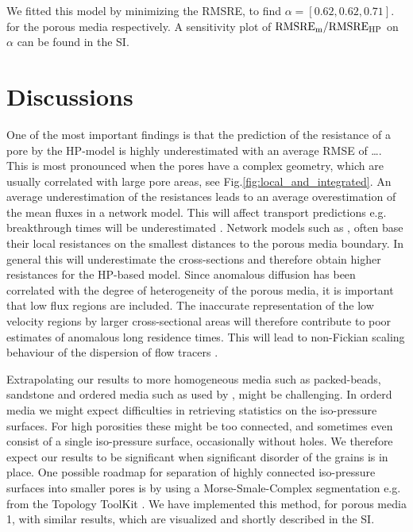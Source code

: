 \documentclass[draft]{agujournal2019}
\begin{document}
We fitted this model by minimizing the RMSRE, to find $\alpha =[0.62, 0.62, 0.71]$. for the porous media respectively. A sensitivity plot of $\rm{RMSRE}_m/\rm{RMSRE}_{HP}$ on $\alpha$ can be found in the SI. 





\section{Discussions}

One of the most important findings is that the prediction of the resistance of a pore by the HP-model is highly underestimated with an average RMSE of \ldots. This is most pronounced when the pores have a complex geometry, which are usually correlated with large pore areas, see Fig.\ref{fig:local_and_integrated}. An average underestimation of the resistances leads to an average overestimation of the mean fluxes in a network model. This will affect transport predictions e.g. breakthrough times will be underestimated \cite{dentz_mechanisms_2018}. Network models such as \cite{alim_local_2017}, often base their local resistances on the smallest distances to the porous media boundary. In general this will underestimate the cross-sections and therefore obtain higher resistances for the HP-based model. Since anomalous diffusion has been correlated with the degree of heterogeneity of the porous media, it is important that low flux regions are included. The inaccurate representation of the low velocity regions by larger cross-sectional areas will therefore contribute to poor estimates of anomalous long residence times. This will lead to non-Fickian scaling behaviour of the dispersion of flow tracers \cite{dentz_mechanisms_2018,dentz_delay_2006}.



Extrapolating our results to more homogeneous media such as packed-beads, sandstone and ordered media such as used by \cite{alim_local_2017}, might be challenging. In orderd media we might expect difficulties in retrieving statistics on the iso-pressure surfaces. For high porosities these might be too connected, and sometimes even consist of a single iso-pressure surface, occasionally without holes. We therefore expect our results to be significant when significant disorder of the grains is in place. One possible roadmap for separation of highly connected iso-pressure surfaces into smaller pores is by using a Morse-Smale-Complex segmentation e.g. from the Topology ToolKit . We have implemented this method, for porous media 1, with similar results, which are visualized and shortly described in the SI. 
\end{document}
